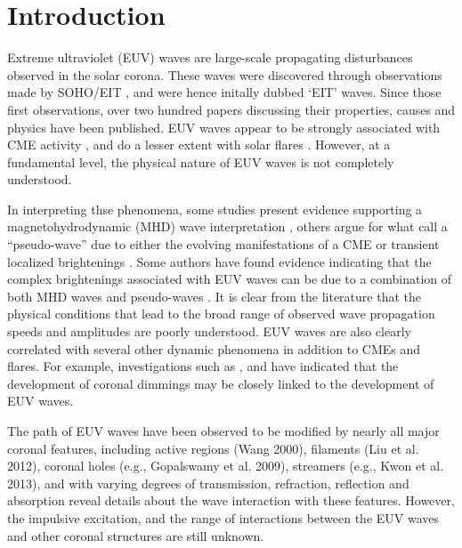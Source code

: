 \section{Introduction}\label{sec:Intro}

Extreme ultraviolet (EUV) waves are large-scale propagating
disturbances observed in the solar corona. These waves were discovered through observations made by SOHO/EIT \citep{1997SoPh..175..571M, 1998GeoRL..25.2465T, 1999ApJ...517L.151T}, and were hence initally dubbed `EIT' waves. Since those first observations, over two hundred papers discussing their properties, causes and physics have been published. EUV waves appear to be strongly associated with CME activity \cite{2002ApJ...569.1009B}, and do a lesser extent with solar flares \cite{2006ApJ...641L.153}. However, at a fundamental level, the physical nature of EUV waves is not
completely understood. 

In interpreting thse phenomena, some studies present evidence supporting a magnetohydrodynamic (MHD) wave interpretation
\citep{1998GeoRL..25.2465T, 1999ApJ...517L.151T,2000ApJ...543L..89W,
  2001JGR...10625089W, 2002ApJ...574..440O, 2010ApJ...713.1008S},
others argue for what \cite{2012SoPh..281..187P} call a “pseudo-wave”
due to either the evolving manifestations of a CME
\citep{1999SoPh..190..107D, 2000ApJ...545..512D, 2008SoPh..247..123D,
  2011ApJ...738..167S} or transient localized brightenings
\citep{2007AN....328..760A, 2007ApJ...656L.101A,}.  Some authors have
found evidence indicating that the complex brightenings associated
with EUV waves can be due to a combination of both MHD waves and
pseudo-waves \citep{2002ApJ...572L..99C, 2005ApJ...622.1202C,
  2004A&A...427..705Z, 2009ApJ...705..587C}.  It is clear from the
literature that the physical conditions that lead to the broad range
of observed wave propagation speeds \citep{2011A&A...532A.151W} and
amplitudes are poorly understood. EUV waves are also clearly correlated with several other dynamic
phenomena in addition to CMEs and flares. For example, investigations such as \cite{2000SoPh..193..161T}, \cite{2004A&A...427..705Z} and \cite{2010ApJ...709..369P} have indicated that the development of coronal dimmings may be closely linked to the development of EUV
waves.

The path of EUV waves have been observed to be modified by nearly all
major coronal features, including active regions (Wang 2000),
filaments (Liu et al. 2012), coronal holes (e.g., Gopalswamy et
al. 2009), streamers (e.g., Kwon et al. 2013), and with varying
degrees of transmission, refraction, reflection and absorption reveal
details about the wave interaction with these features. However, the
impulsive excitation, and the range of interactions between the EUV
waves and other coronal structures are still unknown.

